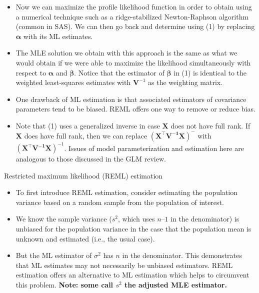 \documentclass[
  9pt,
  ignorenonframetext,
]{beamer}
\begin{document}
\begin{frame}{}
\protect\hypertarget{section-9}{}
\begin{itemize}
\item
  Now we can maximize the profile likelihood function in order to obtain
  using a numerical technique such as a ridge-stabilized Newton-Raphson
  algorithm (common in SAS). We can then go back and determine using (1)
  by replacing \(\pmb \alpha\) with its ML estimates.
\item
  The MLE solution we obtain with this approach is the same as what we
  would obtain if we were able to maximize the likelihood simultaneously
  with respect to \(\pmb \alpha\) and \(\pmb \beta\). Notice that the
  estimator of \(\pmb \beta\) in (1) is identical to the weighted
  least-squares estimates with \(\pmb V^{-1}\) as the weighting matrix.
\item
  One drawback of ML estimation is that associated estimators of
  covariance parameters tend to be biased. REML offers one way to remove
  or reduce bias.
\item
  Note that (1) uses a generalized inverse in case \(\pmb X\) does not
  have full rank. If \(\pmb X\) does have full rank, then we can replace
  \((\pmb {X^{\top}V^{-1}X})^-\) with \((\pmb {X^{\top}V^{-1}X})^{-1}\).
  Issues of model parameterization and estimation here are analogous to
  those discussed in the GLM review.
\end{itemize}
\end{frame}

\begin{frame}{Restricted maximum likelihood (REML) estimation}
\protect\hypertarget{restricted-maximum-likelihood-reml-estimation}{}
\begin{itemize}
\item
  To first introduce REML estimation, consider estimating the population
  variance based on a random sample from the population of interest.
\item
  We know the sample variance (\(s^2\), which uses \(n–1\) in the
  denominator) is unbiased for the population variance in the case that
  the population mean is unknown and estimated (i.e., the usual case).
\item
  But the ML estimator of \(\sigma^2\) has \(n\) in the denominator.
  This demonstrates that ML estimates may not necessarily be unbiased
  estimators. REML estimation offers an alternative to ML estimation
  which helps to circumvent this problem. \textbf{Note: some call
  \(s^2\) the adjusted MLE estimator.}
\end{itemize}
\end{frame}
\end{document}
